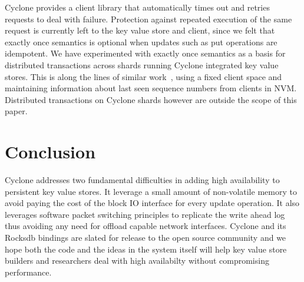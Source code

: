 \documentclass[pageno]{jpaper}
\begin{document}
Cyclone provides a client library that automatically times out and retries
requests to deal with failure. Protection against repeated execution of the same
request is currently left to the key value store and client, since we felt that
exactly once semantics is optional when updates such as put operations are
idempotent. We have experimented with exactly once semantics as a basis for
distributed transactions across shards running Cyclone integrated key value
stores. This is along the lines of similar work~\cite{raft_lin}, using a fixed
client space and maintaining information about last seen sequence numbers from
clients in NVM. Distributed transactions on Cyclone shards however are outside
the scope of this paper.

\section{Conclusion}
Cyclone addresses two fundamental difficulties in adding high availability to
persistent key value stores. It leverage a small amount of non-volatile memory
to avoid paying the cost of the block IO interface for every update
operation. It also leverages software packet switching principles to replicate
the write ahead log thus avoiding any need for offload capable network
interfaces.  Cyclone and its Rocksdb bindings are slated for release to the open
source community and we hope both the code and the ideas in the system itself
will help key value store builders and researchers deal with high availabilty
without compromising performance.
\newcommand\myurl[2]{\url{#1}}


\end{document}
